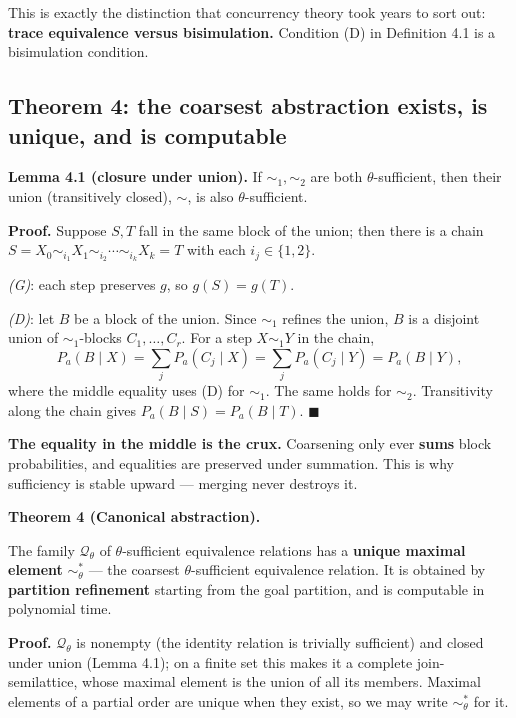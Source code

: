 \documentclass[11pt]{article}
\renewenvironment{quote}
  {\def\FrameCommand{{\color{gray!60}\vrule width 2pt}\hspace{8pt}}%
   \MakeFramed{\advance\hsize-\width \FrameRestore}\begin{itshape}}
  {\end{itshape}\endMakeFramed}
\begin{document}
This is exactly the distinction that concurrency theory took years to sort out: \textbf{trace equivalence versus bisimulation.} Condition (D) in Definition 4.1 is a bisimulation condition.

\hypertarget{theorem-4-the-coarsest-abstraction-exists-is-unique-and-is-computable}{%
\subsection{Theorem 4: the coarsest abstraction exists, is unique, and is computable}\label{theorem-4-the-coarsest-abstraction-exists-is-unique-and-is-computable}}

\textbf{Lemma 4.1 (closure under union).} If \(\sim_1,\sim_2\) are both \(\theta\)-sufficient, then their union (transitively closed), \(\sim\), is also \(\theta\)-sufficient.

\textbf{Proof.} Suppose \(S,T\) fall in the same block of the union; then there is a chain \(S=X_0\sim_{i_1}X_1\sim_{i_2}\cdots\sim_{i_k}X_k=T\) with each \(i_j\in\{1,2\}\).

\emph{(G)}: each step preserves \(g\), so \(g(S)=g(T)\).

\emph{(D)}: let \(B\) be a block of the union. Since \(\sim_1\) refines the union, \(B\) is a disjoint union of \(\sim_1\)-blocks \(C_1,\dots,C_r\). For a step \(X\sim_1 Y\) in the chain,
\[P_a(B\mid X)=\sum_j P_a(C_j\mid X)=\sum_j P_a(C_j\mid Y)=P_a(B\mid Y),\]
where the middle equality uses (D) for \(\sim_1\). The same holds for \(\sim_2\). Transitivity along the chain gives \(P_a(B\mid S)=P_a(B\mid T)\). \(\blacksquare\)

\begin{quote}
\textbf{The equality in the middle is the crux.} Coarsening only ever \textbf{sums} block probabilities, and equalities are preserved under summation. This is why sufficiency is stable upward --- merging never destroys it.
\end{quote}

\textbf{Theorem 4 (Canonical abstraction).}

\begin{quote}
The family \(\mathcal Q_\theta\) of \(\theta\)-sufficient equivalence relations has a \textbf{unique maximal element} \(\sim_\theta^*\) --- the coarsest \(\theta\)-sufficient equivalence relation. It is obtained by \textbf{partition refinement} starting from the goal partition, and is computable in polynomial time.
\end{quote}

\textbf{Proof.} \(\mathcal Q_\theta\) is nonempty (the identity relation is trivially sufficient) and closed under union (Lemma 4.1); on a finite set this makes it a complete join-semilattice, whose maximal element is the union of all its members. Maximal elements of a partial order are unique when they exist, so we may write \(\sim_\theta^*\) for it.
\end{document}
